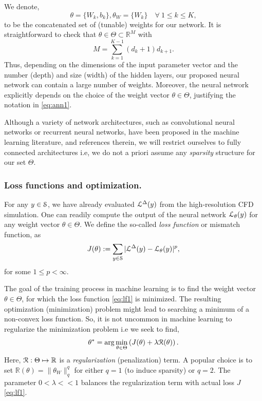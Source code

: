 \documentclass[a4paper]{article}
\numberwithin{equation}{section}
\numberwithin{equation}{section}
\theoremstyle{definition}
\theoremstyle{myremarkstyle}
\renewcommand{\leq}{\leqslant}
\newcommand{\R}{\mathbb{R}}
\newcommand{\map}{\EuScript{L}}
\newcommand{\train}{\EuScript{S}}
\newcommand{\reg}{\EuScript{R}}
\begin{document}
We denote, 
\begin{equation}
\label{eq:theta}
\theta = \{W_k, b_k\}, \theta_W = \{ W_k \}\quad \forall~ 1 \leq k \leq K,
\end{equation} 
to be the concatenated set of (tunable) weights for our network. It is straightforward to check that $\theta \in \Theta \subset \R^M$ with
\begin{equation}
\label{eq:ns}
M = \sum\limits_{k=1}^{K-1} (d_k +1) d_{k+1}.
\end{equation}
 Thus, depending on the dimensions of the input parameter vector and the number (depth) and size (width) of the hidden layers, our proposed neural network can contain a large number of weights. Moreover, the neural network explicitly depends on the choice of the weight vector $\theta \in \Theta$, justifying the notation in \eqref{eq:ann1}. 
 
 Although a variety of network architectures, such as convolutional neural networks or recurrent neural networks, have been proposed in the machine learning literature, \cite{DLbook} and references therein, we will restrict ourselves to fully connected architectures i.e, we do not a priori assume any \emph{sparsity} structure for our set $\Theta$. 

\subsubsection{Loss functions and optimization.} 
For any $y \in \train$, we have already evaluated $\map^{\Delta}(y)$ from the high-resolution CFD simulation. One can readily compute the output of the neural network $\map_{\theta} (y)$ for any weight vector $\theta \in \Theta$. We define the so-called 
\emph{loss function} or mismatch function, as 
\begin{equation}
\label{eq:lf1}
J (\theta) : = \sum\limits_{y \in \train} |\map^{\Delta}(y) - \map_{\theta} (y) |^p,
\end{equation}
for some $1 \leq p < \infty$.  

The goal of the training process in machine learning is to find the weight vector $\theta \in \Theta$, for which the loss function \eqref{eq:lf1} is minimized. The resulting optimization (minimization) problem might lead to searching a minimum of a non-convex loss function. So, it is not uncommon in machine learning \cite{DLbook} to regularize the minimization problem i.e we seek to find,
\begin{equation}
\label{eq:lf2}
\theta^{\ast} = {\rm arg}\min\limits_{\theta \in \Theta} \left(J(\theta) + \lambda \reg(\theta) \right).
\end{equation}  
Here, $\reg:\Theta \mapsto \R$ is a \emph{regularization} (penalization) term. A popular choice is to set  $\R(\theta) = \|\theta_W\|^q_q$ for either $q=1$ (to induce sparsity) or $q=2$. The parameter $0 < \lambda << 1$ balances the regularization term with actual loss $J$ \eqref{eq:lf1}. 
\end{document}
